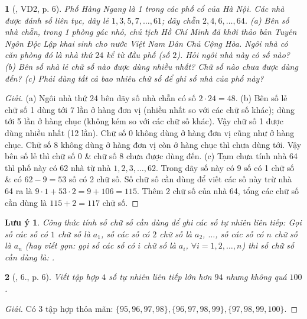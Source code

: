 \documentclass{article}
\newtheorem{baitoan}{}
\newtheorem{luuy}{Lưu ý}
\begin{document}
\begin{baitoan}[\cite{Tuyen_Toan_6}, VD2, p. 6]
	Phố Hàng Ngang là 1 trong các phố cổ của Hà Nội. Các nhà được đánh số liên tục, dãy lẻ $1,3,5,7,\ldots,61$; dãy chẵn $2,4,6,\ldots,64$. (a) Bên số nhà chẵn, trong 1 phòng gác nhỏ, chủ tịch Hồ Chí Minh đã khởi thảo bản Tuyên Ngôn Độc Lập khai sinh cho nước Việt Nam Dân Chủ Cộng Hòa. Ngôi nhà có căn phòng đó là nhà thứ $24$ kể từ đầu phố (số $2$). Hỏi ngôi nhà này có số nào? (b) Bên số nhà lẻ chữ số nào được dùng nhiều nhất? Chữ số nào chưa được dùng đến? (c) Phải dùng tất cả bao nhiêu chữ số để ghi số nhà của phố này?
\end{baitoan}

\begin{proof}[Giải]
	(a) Ngôi nhà thứ 24 bên dãy số nhà chẵn có số $2\cdot24 = 48$. (b) Bên số lẻ chữ số 1 dùng tới 7 lần ở hàng đơn vị (nhiều nhất so với các chữ số khác); dùng tới 5 lần ở hàng chục (không kém so với các chữ số khác). Vậy chữ số 1 được dùng nhiều nhất (12 lần). Chữ số 0 không dùng ở hàng đơn vị cũng như ở hàng chục. Chữ số 8 không dùng ở hàng đơn vị còn ở hàng chục thì chưa dùng tới. Vậy bên số lẻ thì chữ số 0 \& chữ số 8 chưa được dùng đến. (c) Tạm chưa tính nhà 64 thì phố này có 62 nhà từ nhà $1,2,3,\ldots,62$. Trong dãy số này có 9 số có 1 chữ số \& có $62 - 9 = 53$ số có 2 chữ số. Số chữ số cần dùng để viết các số này trừ nhà 64 ra là $9\cdot1 + 53\cdot2 = 9 + 106 = 115$. Thêm 2 chữ số của nhà 64, tổng các chữ số cần dùng là $115 + 2 = 117$ chữ số.
\end{proof}

\begin{luuy}
	Công thức tính số chữ số cần dùng để ghi các số tự nhiên liên tiếp: Gọi số các số có $1$ chữ số là $a_1$, số các số có $2$ chữ số là $a_2$, $\ldots$,  số các số có $n$ chữ số là $a_n$ (hay viết gọn: gọi số các số có $i$ chữ số là $a_i$, $\forall i = 1,2,\ldots,n$) thì số chữ số cần dùng là: .
\end{luuy}

\begin{baitoan}[\cite{Tuyen_Toan_6}, 6., p. 6]
	Viết tập hợp $4$ số tự nhiên liên tiếp lớn hơn $94$ nhưng không quá $100$.
\end{baitoan}

\begin{proof}[Giải]
	Có 3 tập hợp thỏa mãn: $\{95,96,97,98\},\{96,97,98,99\},\{97,98,99,100\}$.
\end{proof}
\end{document}
